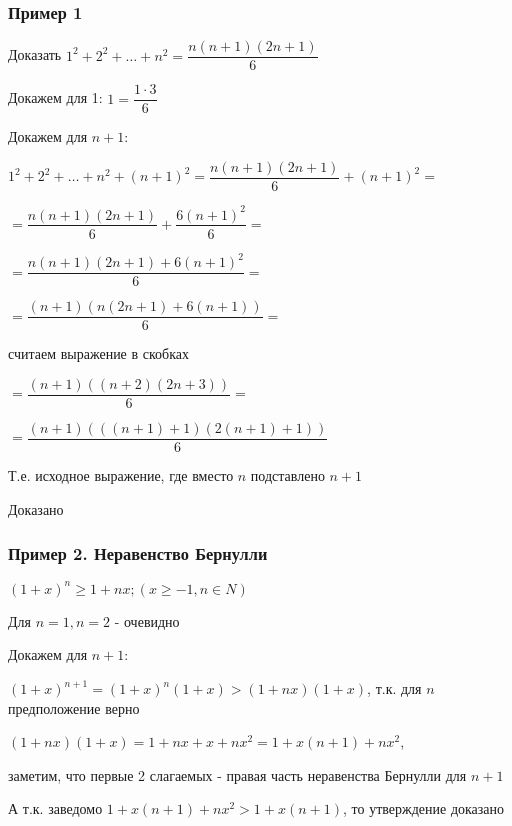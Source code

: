 \subsubsection{Пример 1}

Доказать
$1^2 + 2^2 + \ldots + n^2 = \dfrac{n(n+1)(2n+1)}{6}$

Докажем для 1: $1 = \dfrac{1 \cdot 3}{6}$

Докажем для $n+1$:

$1^2 + 2^2 + \ldots + n^2 + (n+1)^2 = \dfrac{n(n+1)(2n+1)}{6} + (n+1)^2 = $

$ = \dfrac{n(n+1)(2n+1)}{6} + \dfrac{6(n+1)^2}{6} = $

$= \dfrac{n(n+1)(2n+1) + 6(n+1)^2}{6} = $

$ = \dfrac{(n+1)( n(2n+1) + 6(n+1) )}{6} = $

считаем выражение в скобках

$ = \dfrac{(n+1)( (n+2)(2n+3) )}{6} = $

$ = \dfrac{(n+1)( ((n+1) + 1) (2(n+1) + 1) )}{6}$

Т.е. исходное выражение, где вместо $ n $  подставлено $ n+1 $

Доказано

\subsubsection{Пример 2. Неравенство Бернулли}

$(1+x)^n \ge 1 + nx; (x \ge -1, n \in N  ) $

Для $ n = 1, n = 2 $ - очевидно

Докажем для $n+1$:

$ (1+x)^{n+1} = (1+x)^{n}(1+x) > (1+nx)(1+x) $, т.к. для $ n $ предположение верно

$ (1+nx)(1+x) = 1 + nx + x + nx^{2} = 1+ x(n+1) + nx^{2} $, 

заметим, что первые 2 слагаемых  - правая часть неравенства Бернулли для $ n+1 $

А т.к. заведомо $ 1 + x(n+1) + nx^{2} > 1 + x(n+1) $, то утверждение доказано
